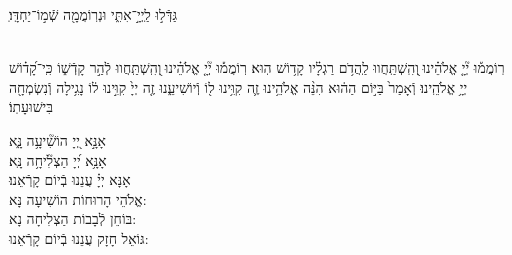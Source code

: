 \documentclass[twoside, openany, parskip=half, 11pt]{book}
\begin{document}
\shatz
ֽגַּדְּֿל֣וּ לַֽיְיָ֣־אִתִּ֑י וּנְרֽוֹמֲמָ֖ה שְֿׁמ֣וֹ־יַחְדָּֽו׃

\\
רֽוֹמֲמ֡וּ יְ֘יָ֤ אֱלֹהֵ֗ינוּ ֖וְהִֽשְׁתַּֽחֲווּ לַֽהֲדֹ֥ם רַגְלָ֗יו קָד֥וֹשׁ הֽוּא׃
רֽוֹמֲמ֡וּ יְ֘יָ֤ אֱלֹהֵ֗ינוּ ֖וְהִֽשְׁתַּֽחֲווּ לְֿהַ֣ר קָדְֿשׁ֑וֹ כִּֽי־קָ֝ד֗וֹשׁ יְיָ֥ אֱלֹהֵֽינוּ׃
וְֿאָמַר֙ בַּיּ֣וֹם הַה֔וּא הִנֵּ֨ה אֱלֹהֵ֥ינוּ זֶ֛ה קִוִּ֥ינוּ ל֖וֹ וְֿיוֹשִׁיעֵ֑נוּ זֶ֤ה יְיָ֙ קִוִּ֣ינוּ ל֔וֹ נָגִ֥ילָה וְֿנִשְׂמְחָ֖ה בִּישׁוּעָתֽוֹ׃



אָנָּ֣א יְ֭יָ הוֹשִׁ֘יעָ֥ה נָּ֑א\\
אָנָּ֥א יְ֝יָ הַצְלִ֘יחָ֥ה נָּֽא׃\\
אָנָּא יְיָ֗ עֲנֵנוּ בְֿיוֹם קָרְֿאֵנוּ׃\\

אֱלֹהֵי הָרוּחוֹת הוֹשִׁיעָה נָּא:\\ בּוֹחֵן לְֿבָבוֹת הַצְלִיחָה נָא:\\ גּוֹאֵל חָזָק עֲנֵנוּ בְֿיוֹם קָרְֿאֵנוּ:


\end{document}

